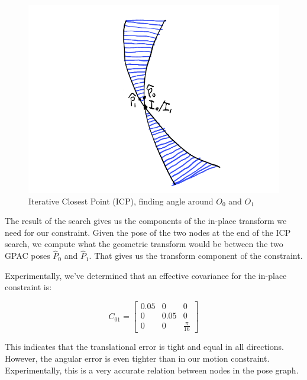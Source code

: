 \begin{figure}
  \begin{center}
    \includegraphics[scale=0.6]{5_inplace_ICP.png}
  \end{center}
  \caption{Iterative Closest Point (ICP), finding angle around $O_0$ and $O_1$}
	\label{fig:inplace_ICP}
\end{figure}

The result of the search gives us the components of the in-place transform we need for our constraint.  Given the pose of the two nodes at the end of the ICP search, we compute what the geometric transform would be between the two GPAC poses $\hat{P}_0$ and $\hat{P}_1$.  That gives us the transform component of the constraint.

Experimentally, we've determined that an effective covariance for the in-place constraint is:

\begin{equation}
C_{01} = 
\begin{bmatrix}
0.05 & 0 & 0 \\
0 & 0.05 & 0 \\
0 & 0 & \frac{\pi}{16}
\end{bmatrix}
\end{equation}


This indicates that the translational error is tight and equal in all directions.  However, the angular error is even tighter than in our motion constraint.  Experimentally, this is a very accurate relation between nodes in the pose graph.




